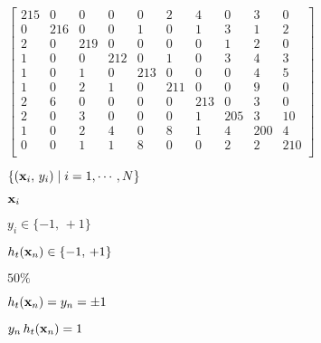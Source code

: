 \documentclass{article}
\def\lthtmlcheckvsize{\ifdim\ht\sizebox<\vsize 
  \ifdim\wd\sizebox<\hsize\expandafter\hfill\fi \expandafter\vfill
  \else\expandafter\vss\fi}%
\begin{document}
{\newpage\clearpage
{}%
$\displaystyle \left[ \begin{array}{rrrrrrrrrr}
215 &   0 &   0 &   0 &   0 &   2 &   4 &   0 &   3  &  0 \\
0 & 216 &   0 &   0 &   1 &   0 &   1 &   3 &   1  &  2 \\
2 &   0 & 219 &   0 &   0 &   0 &   0 &   1 &   2  &  0 \\
1 &   0 &   0 & 212 &   0 &   1 &   0 &   3 &   4  &  3 \\
1 &   0 &   1 &   0 & 213 &   0 &   0 &   0 &   4  &  5 \\
1 &   0 &   2 &   1 &   0 & 211 &   0 &   0 &   9  &  0 \\
2 &   6 &   0 &   0 &   0 &   0 & 213 &   0 &   3  &  0 \\
2 &   0 &   3 &   0 &   0 &   0 &   1 & 205 &   3  & 10 \\
1 &   0 &   2 &   4 &   0 &   8 &   1 &   4 & 200  &  4 \\
0 &   0 &   1 &   1 &   8 &   0 &   0 &   2 &   2  &210 \\
\end{array} \right]$%
\lthtmlindisplaymathZ
\lthtmlcheckvsize\clearpage}

{\newpage\clearpage
{}%
$ \{ ({\bf x}_i,\,y_i)\;|\;i=1,\cdots,N\}$%
\lthtmlindisplaymathZ
\lthtmlcheckvsize\clearpage}

{\newpage\clearpage
{}%
$ {\bf x}_i$%
\lthtmlindisplaymathZ
\lthtmlcheckvsize\clearpage}

{\newpage\clearpage
{}%
$ y_i\in\{-1,\,+1\}$%
\lthtmlindisplaymathZ
\lthtmlcheckvsize\clearpage}

{\newpage\clearpage
{}%
$ h_t({\bf x}_n)\in\{-1,\,+1\}$%
\lthtmlindisplaymathZ
\lthtmlcheckvsize\clearpage}

{\newpage\clearpage
{}%
$ 50\%$%
\lthtmlindisplaymathZ
\lthtmlcheckvsize\clearpage}

{\newpage\clearpage
{}%
$ h_t({\bf x}_n)=y_n=\pm 1$%
\lthtmlindisplaymathZ
\lthtmlcheckvsize\clearpage}

{\newpage\clearpage
{}%
$ y_n\,h_t({\bf x}_n)=1$%
\lthtmlindisplaymathZ
\lthtmlcheckvsize\clearpage}
\end{document}
